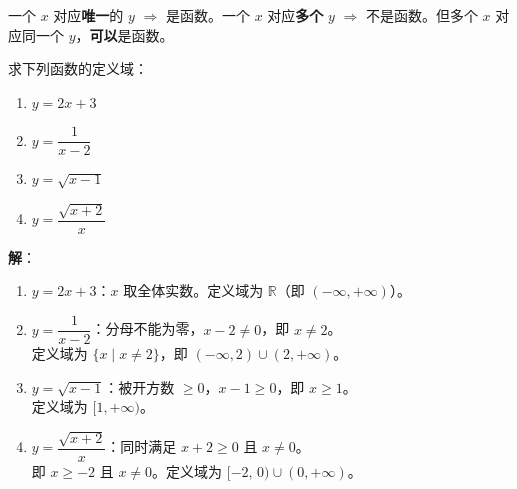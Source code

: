 \documentclass[12pt, a4paper]{ctexart}
\begin{document}
\begin{tipbox}[判断关键]
一个 $x$ 对应\textbf{唯一}的 $y$ $\Rightarrow$ 是函数。一个 $x$ 对应\textbf{多个} $y$ $\Rightarrow$ 不是函数。但多个 $x$ 对应同一个 $y$，\textbf{可以}是函数。
\end{tipbox}

\begin{examplebox}[【例题3】求函数的定义域]
求下列函数的定义域：
\begin{enumerate}[label=(\arabic*)]
  \item $y = 2x + 3$
  \item $y = \dfrac{1}{x - 2}$
  \item $y = \sqrt{x - 1}$
  \item $y = \dfrac{\sqrt{x+2}}{x}$
\end{enumerate}
\end{examplebox}

\textbf{解}：
\begin{enumerate}[label=(\arabic*)]
  \item $y = 2x + 3$：$x$ 取全体实数。定义域为 $\mathbb{R}$（即 $(-\infty, +\infty)$）。
  \item $y = \dfrac{1}{x-2}$：分母不能为零，$x - 2 \neq 0$，即 $x \neq 2$。\\
        定义域为 $\{x \mid x \neq 2\}$，即 $(-\infty, 2) \cup (2, +\infty)$。
  \item $y = \sqrt{x-1}$：被开方数 $\geqslant 0$，$x - 1 \geqslant 0$，即 $x \geqslant 1$。\\
        定义域为 $[1, +\infty)$。
  \item $y = \dfrac{\sqrt{x+2}}{x}$：同时满足 $x + 2 \geqslant 0$ 且 $x \neq 0$。\\
        即 $x \geqslant -2$ 且 $x \neq 0$。定义域为 $[-2,\,0) \cup (0, +\infty)$。
\end{enumerate}
\end{document}
